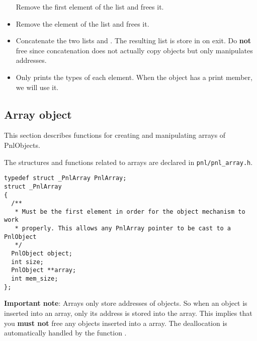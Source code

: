 \begin{itemize}
  \sshortdescribe Remove the first element of the list  and frees it.
\item {}
  \sshortdescribe Remove the  element of the list  and frees it.
\item {}
  \sshortdescribe Concatenate the two lists  and . The
  resulting list is store in  on exit. Do {\bf not} free 
  since concatenation does not actually copy objects but only manipulates
  addresses.
\item {}
  \sshortdescribe Only prints the types of each element. When  the
   object has a print member, we will use it.
\end{itemize}

\subsection{Array object}

This section describes functions for creating and manipulating arrays of
PnlObjects.

The structures and functions related to arrays are declared in
\verb!pnl/pnl_array.h!.

\begin{verbatim}
typedef struct _PnlArray PnlArray;
struct _PnlArray
{
  /**
   * Must be the first element in order for the object mechanism to work
   * properly. This allows any PnlArray pointer to be cast to a PnlObject
   */
  PnlObject object; 
  int size;
  PnlObject **array;
  int mem_size;
};
\end{verbatim}

\textbf{Important note}: Arrays only store addresses of objects. So when an
object is inserted into an array, only its address is stored into the array. This
implies that you \textbf{must not} free any objects inserted into a array. The
deallocation is automatically handled by the function .

